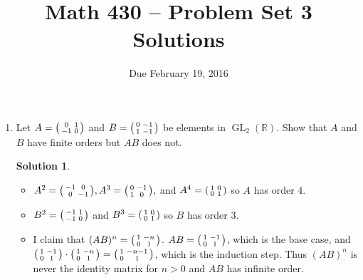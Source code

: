 \documentclass{article}
\title{Math 430 -- Problem Set 3 Solutions}
\date{Due February 19, 2016}
\newcommand{\RR}{\mathbb{R}}
\DeclareMathOperator{\GL}{GL}
\theoremstyle{definition}
\newtheorem*{solution}{Solution}
\begin{document}
\maketitle


\begin{enumerate}
\item[4.14.] Let $A = \begin{psmallmatrix} 0 & 1 \\ -1 & 0 \end{psmallmatrix}$ and $B = \begin{psmallmatrix} 0 & -1 \\ 1 & -1 \end{psmallmatrix}$ be elements in $\GL_2(\RR)$.  Show that $A$ and $B$ have finite orders but $AB$ does not.
\begin{solution} $ $
\begin{itemize}
\item $A^2 = \begin{psmallmatrix} -1 & 0 \\ 0 & -1 \end{psmallmatrix}, A^3 = \begin{psmallmatrix} 0 & -1 \\ 1 & 0 \end{psmallmatrix},$ and $A^4 = \begin{psmallmatrix} 1 & 0 \\ 0 & 1 \end{psmallmatrix}$ so $A$ has order $4$.
\item $B^2 = \begin{psmallmatrix} -1 & 1 \\ -1 & 0 \end{psmallmatrix}$ and $B^3 = \begin{psmallmatrix} 1 & 0 \\ 0 & 1 \end{psmallmatrix}$ so $B$ has order $3$.
\item I claim that $(AB)^n = \begin{psmallmatrix} 1 & -n \\ 0 & 1 \end{psmallmatrix}$.  $AB = \begin{psmallmatrix} 1 & -1 \\ 0 & 1 \end{psmallmatrix}$, which is the base case, and $\begin{psmallmatrix} 1 & -1 \\ 0 & 1 \end{psmallmatrix} \cdot \begin{psmallmatrix} 1 & -n \\ 0 & 1 \end{psmallmatrix} = \begin{psmallmatrix} 1 & -n-1 \\ 0 & 1 \end{psmallmatrix}$, which is the induction step.  Thus $(AB)^n$ is never the identity matrix for $n>0$ and $AB$ has infinite order.

\end{itemize}
\end{solution}
\end{enumerate}
\end{document}
